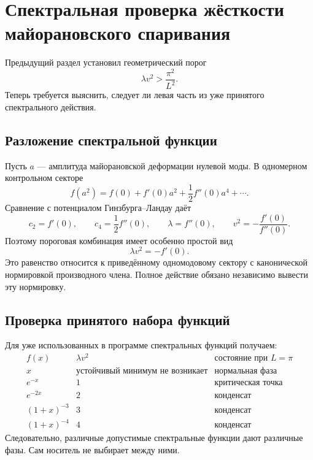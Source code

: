 \chapter{Спектральная проверка жёсткости майорановского спаривания}

Предыдущий раздел установил геометрический порог
\[
 \lambda v^2>\frac{\pi^2}{L^2}.
\]
Теперь требуется выяснить, следует ли левая часть из уже принятого
спектрального действия.

\section{Разложение спектральной функции}

Пусть \(a\) --- амплитуда майорановской деформации нулевой моды. В
одномерном контрольном секторе
\begin{equation}
 f(a^2)
 =f(0)+f'(0)a^2+\frac12f''(0)a^4+\cdots .
\end{equation}
Сравнение с потенциалом Гинзбурга--Ландау даёт
\begin{equation}
 c_2=f'(0),\qquad
 c_4=\frac12f''(0),\qquad
 \lambda=f''(0),\qquad
 v^2=-\frac{f'(0)}{f''(0)}.
\end{equation}
Поэтому пороговая комбинация имеет особенно простой вид
\begin{equation}
 \boxed{\lambda v^2=-f'(0)}.
\end{equation}
Это равенство относится к приведённому одномодовому сектору с канонической
нормировкой производного члена. Полное действие обязано независимо вывести
эту нормировку.

\section{Проверка принятого набора функций}

Для уже использованных в программе спектральных функций получаем:
\[
\begin{array}{c|c|c}
 f(x) & \lambda v^2 & \text{состояние при }L=\pi\\
\hline
 x & \text{устойчивый минимум не возникает} & \text{нормальная фаза}\\
 e^{-x} & 1 & \text{критическая точка}\\
 e^{-2x} & 2 & \text{конденсат}\\
 (1+x)^{-3} & 3 & \text{конденсат}\\
 (1+x)^{-4} & 4 & \text{конденсат}
\end{array}
\]
Следовательно, различные допустимые спектральные функции дают различные
фазы. Сам носитель не выбирает между ними.

